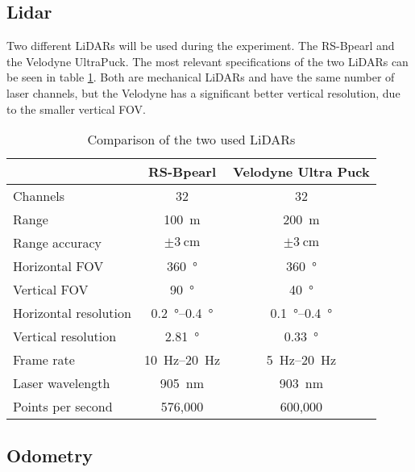 \subsection{Lidar}
Two different LiDARs will be used during the experiment.
The RS-Bpearl and the Velodyne UltraPuck.
The most relevant specifications of the two LiDARs can be seen in table \ref{tab:lidar_datasheets}.
Both are mechanical LiDARs and have the same number of laser channels, but the Velodyne has a significant better vertical resolution, due to the smaller vertical FOV.
\begin{table}[ht]
	\centering
	\caption{Comparison of the two used LiDARs \cite{RoboSense2020}\cite{Rev}}
	\label{tab:lidar_datasheets}
	\begin{tabular}[t]{lcc}
	\toprule
	&\textbf{RS-Bpearl} & \textbf{Velodyne Ultra Puck}\\
	\midrule
	Channels 				& 32 							& 32\\
	Range 					& \SI{100}{\metre}				& \SI{200}{\metre}\\
	Range accuracy			& $\pm\SI{3}{\centi\metre}$		& $\pm\SI{3}{\centi\metre}$\\
	Horizontal FOV		 	& \SI{360}{\degree}				& \SI{360}{\degree}\\
	Vertical FOV 			& \SI{90}{\degree}				& \SI{40}{\degree}\\
	Horizontal resolution	& \SIrange{0.2}{0.4}{\degree} 	& \SIrange{0.1}{0.4}{\degree}\\
	Vertical resolution		& \SI{2.81}{\degree} 			& \SI{0.33}{\degree}\\
	Frame rate 				& \SIrange{10}{20}{\hertz}		& \SIrange{5}{20}{\hertz}\\
	Laser wavelength 		& \SI{905}{\nano\metre} 		& \SI{903}{\nano\metre}\\
	Points per second 		& 576,000						& 600,000		\\
	\bottomrule
	\end{tabular}
	\end{table}%


\subsection{Odometry}



